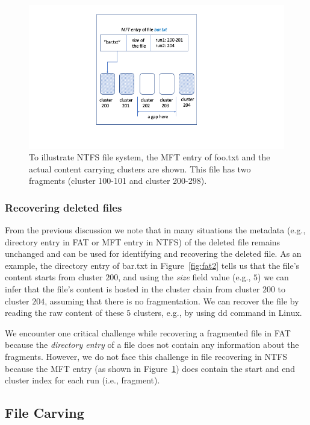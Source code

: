  \begin{figure}[h]
     \centering
     \includegraphics[width=\linewidth]{fig/ntfs.png}
     \caption{To illustrate NTFS file system, the MFT entry of foo.txt and the actual content carrying clusters are shown. 
 This file has two fragments (cluster 100-101 and cluster 200-298).}
     \label{fig:ntfs}
 \end{figure}
 

\subsubsection{Recovering deleted files}\label{subsubsec:meta-recovery}

From the previous discussion we note that in many situations the metadata
(e.g., directory entry in FAT or MFT entry in NTFS) of the deleted file remains
unchanged and can be used for identifying and recovering the deleted file.
As an example, the directory entry of bar.txt in Figure~\ref{fig:fat2} tells us
that the file's content starts from cluster $200$, 
and using the \emph{size} field value (e.g., $5$) we can infer that the file's content
is hosted in the cluster chain from cluster $200$ to cluster $204$, assuming that there is no
fragmentation. We can recover the file by reading the raw content of these $5$ clusters, e.g.,
by using dd command in Linux.  

We encounter one critical challenge while recovering a fragmented file in FAT because the \emph{directory entry}
of a file does not contain any information about the fragments. However, we do not face this challenge 
in file recovering in NTFS because the MFT entry (as shown in Figure~\ref{fig:ntfs}) does contain the start and end cluster index for each run (i.e., fragment). 

\subsection{File Carving}\label{subsec:file-carving}

